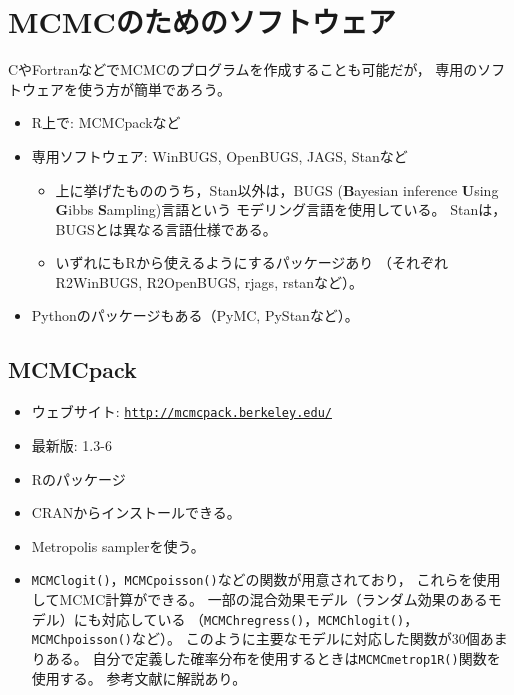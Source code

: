 \documentclass[11pt,uplatex]{jsarticle}
\begin{document}
\section{MCMCのためのソフトウェア}
CやFortranなどでMCMCのプログラムを作成することも可能だが，
専用のソフトウェアを使う方が簡単であろう。
\begin{itemize}
\item  \textsf{R}上で: MCMCpackなど
\item 専用ソフトウェア: \textsf{WinBUGS}, \textsf{OpenBUGS}, \textsf{JAGS}, \textsf{Stan}など
\begin{itemize}
 \item  上に挙げたもののうち，\textsf{Stan}以外は，BUGS (\textbf{B}ayesian inference \textbf{U}sing
 \textbf{G}ibbs \textbf{S}ampling)言語\cite{BUGSBook, BUGS}という
 モデリング言語を使用している。
 \label{BUGS}
\textsf{Stan}は，BUGSとは異なる言語仕様である。
\item  いずれにも\textsf{R}から使えるようにするパッケージあり
（それぞれ\textsf{R2WinBUGS}, \textsf{R2OpenBUGS}, \textsf{rjags}, \textsf{rstan}など）。
\end{itemize}
\item \textsf{Python}のパッケージもある（\textsf{PyMC}, \textsf{PyStan}など）。
\end{itemize}

\subsection{MCMCpack}

\begin{itemize}
\item ウェブサイト: \texttt{\url{http://mcmcpack.berkeley.edu/}}
\item 最新版: 1.3-6
\item \textsf{R}のパッケージ
\item CRANからインストールできる。
\item Metropolis samplerを使う。
\item \texttt{MCMClogit()}，\texttt{MCMCpoisson()}などの関数が用意されており，
これらを使用してMCMC計算ができる。
一部の混合効果モデル（ランダム効果のあるモデル）にも対応している
（\texttt{MCMChregress()}，\texttt{MCMChlogit()}，
\texttt{MCMChpoisson()}など）。
このように主要なモデルに対応した関数が30個あまりある。
自分で定義した確率分布を使用するときは\texttt{MCMCmetrop1R()}関数を使用する。
参考文献\cite{MCMCpack}に解説あり。
\end{itemize}
\end{document}
